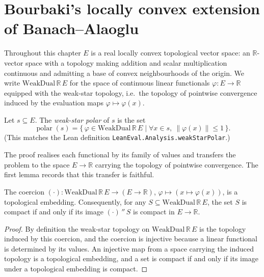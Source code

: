 \section{Bourbaki's locally convex extension of Banach--Alaoglu}

Throughout this chapter $E$ is a real locally convex topological vector space:
an $\mathbb{R}$-vector space with a topology making addition and scalar
multiplication continuous and admitting a base of convex neighbourhoods of the
origin. We write $\mathrm{WeakDual}\,\mathbb{R}\,E$ for the space of continuous
linear functionals $\varphi : E \to \mathbb{R}$ equipped with the weak-star
topology, i.e.\ the topology of pointwise convergence induced by the evaluation
maps $\varphi \mapsto \varphi(x)$.

\begin{definition}
    \label{def:weak-star-polar}
    Let $s \subseteq E$. The \emph{weak-star polar} of $s$ is the set
    \[
        \operatorname{polar}(s)
        = \{\, \varphi \in \mathrm{WeakDual}\,\mathbb{R}\,E \mid
              \forall x \in s,\ \lVert \varphi(x) \rVert \le 1 \,\}.
    \]
    (This matches the Lean definition \texttt{LeanEval.Analysis.weakStarPolar}.)
\end{definition}

The proof realises each functional by its family of values and transfers the
problem to the space $E \to \mathbb{R}$ carrying the topology of pointwise
convergence. The first lemma records that this transfer is faithful.

\begin{lemma}
    \label{lem:coe-embedding}
    The coercion
    $(\cdot) : \mathrm{WeakDual}\,\mathbb{R}\,E \to (E \to \mathbb{R})$,
    $\varphi \mapsto (x \mapsto \varphi(x))$, is a topological embedding.
    Consequently, for any $S \subseteq \mathrm{WeakDual}\,\mathbb{R}\,E$, the set
    $S$ is compact if and only if its image $(\cdot)\,''\,S$ is compact in
    $E \to \mathbb{R}$.
\end{lemma}
\begin{proof}
    By definition the weak-star topology on $\mathrm{WeakDual}\,\mathbb{R}\,E$
    is the topology induced by this coercion, and the coercion is injective
    because a linear functional is determined by its values. An injective map
    from a space carrying the induced topology is a topological embedding, and a
    set is compact if and only if its image under a topological embedding is
    compact.
\end{proof}

